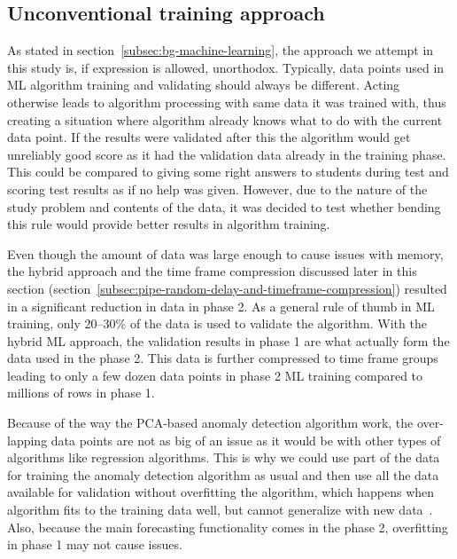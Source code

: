 

\subsection{Unconventional training approach}\label{subsec:pipe-unconventional-training}

As stated in section~\ref{subsec:bg-machine-learning},
the approach we attempt in this study is,
if expression is allowed, unorthodox.
Typically,
data points used in ML algorithm training and validating
should always be different.
Acting otherwise leads to algorithm processing with
same data it was trained with,
thus creating a situation
where algorithm already knows what to do with the current data point.
If the results were validated after this
the algorithm would get unreliably good score
as it had the validation data already in the training phase.
This could be compared to
giving some right answers to students during test
and scoring test results as if no help was given.
However,
due to the nature of the study problem and contents of the data,
it was decided to test whether bending this rule
would provide better results in algorithm training.

Even though the amount of data was large enough
to cause issues with memory,
the hybrid approach and the time frame compression discussed later in this section (section~\ref{subsec:pipe-random-delay-and-timeframe-compression})
resulted in a significant reduction in data in phase 2.
As a general rule of thumb in ML training,
only 20--30\% of the data is used to validate the algorithm.
With the hybrid ML approach,
the validation results in phase 1
are what actually form the data used in the phase 2.
This data is further compressed to time frame groups
leading to only a few dozen data points in phase 2 ML training
compared to millions of rows in phase 1.

Because of the way the PCA-based anomaly detection algorithm work,
the over-lapping data points are not as big of an issue
as it would be with other types of algorithms
like regression algorithms.
This is why we could use part of the data
for training the anomaly detection algorithm as usual
and then use all the data available for validation
without overfitting the algorithm,
which happens when algorithm fits to the training data well,
but cannot generalize with new data~\cite{wang2016machine}.
Also, because the main forecasting functionality comes in the phase 2,
overfitting in phase 1 may not cause issues.

